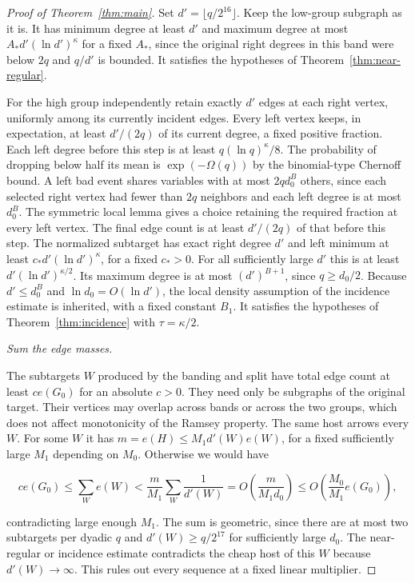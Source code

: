 \documentclass[11pt]{amsart}
\theoremstyle{definition}
\theoremstyle{remark}
\numberwithin{equation}{section}
\begin{document}
\begin{proof}[Proof of Theorem~\ref{thm:main}]
Set $d'=\lfloor q/2^{16}\rfloor $. Keep the low-group subgraph as it is. It has minimum degree at least $ d'$ and maximum degree at most $ A_*d'(\ln d')^\kappa $ for a fixed $ A_*$, since the original right degrees in this band were below $2q $ and $ q/d'$ is bounded. It satisfies the hypotheses of Theorem~\ref{thm:near-regular}.

For the high group independently retain exactly $d'$ edges at each right vertex, uniformly among its currently incident edges. Every left vertex keeps, in expectation, at least $ d'/(2q)$ of its current degree, a fixed positive fraction. Each left degree before this step is at least $ q(\ln q)^\kappa/8$. The probability of dropping below half its mean is $\exp(-\Omega(q))$ by the binomial-type Chernoff bound. A left bad event shares variables with at most $2q d_0^B $ others, since each selected right vertex had fewer than $2q $ neighbors and each left degree is at most $ d_0^B $. The symmetric local lemma gives a choice retaining the required fraction at every left vertex. The final edge count is at least $ d'/(2q)$ of that before this step. The normalized subtarget has exact right degree $ d'$ and left minimum at least $ c_* d'(\ln d')^\kappa $, for a fixed $ c_*>0$. For all sufficiently large $ d'$ this is at least $ d'(\ln d')^{\kappa/2}$. Its maximum degree is at most $(d')^{B+1}$, since $ q\ge d_0/2$. Because $ d'\le d_0^B $ and $\ln d_0=O(\ln d')$, the local density assumption of the incidence estimate is inherited, with a fixed constant $ B_1$. It satisfies the hypotheses of Theorem~\ref{thm:incidence} with $\tau=\kappa/2$.

\medskip\noindent\emph{Sum the edge masses.}

The subtargets $W $ produced by the banding and split have total edge count at least $ c e(G_0)$ for an absolute $ c>0$. They need only be subgraphs of the original target. Their vertices may overlap across bands or across the two groups, which does not affect monotonicity of the Ramsey property. The same host arrows every $ W $. For some $ W $ it has $ m=e(H)\le M_1 d'(W)e(W)$, for a fixed sufficiently large $ M_1$ depending on $ M_0$. Otherwise we would have

\begin{equation}
c e(G_0)\le\sum_W e(W)<\frac{m}{M_1}\sum_W\frac1{d'(W)}
 =O\left(\frac{m}{M_1d_0}\right)\le O\left(\frac{M_0}{M_1}e(G_0)\right),
\end{equation}

contradicting large enough $M_1$. The sum is geometric, since there are at most two subtargets per dyadic $ q $ and $ d'(W)\ge q/2^{17}$ for sufficiently large $ d_0$. The near-regular or incidence estimate contradicts the cheap host of this $ W $ because $ d'(W)\to\infty$. This rules out every sequence at a fixed linear multiplier.


\end{proof}
\end{document}
